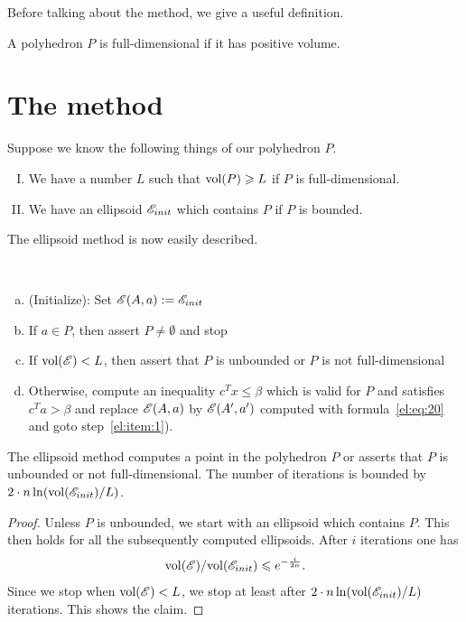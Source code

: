 Before talking about the method, we give a useful definition.

\begin{definition}
   A polyhedron $P$ is full-dimensional if it has positive volume.
\end{definition}

\section{The method}
\label{el:sec:method}



Suppose  we know the following things of our polyhedron $P$. 
\begin{enumerate}[I)]
\item We have a number $L$ such that $\mathrm{vol}(P)\geqslant L$ if $P$ is
  full-dimensional.
\item We have an ellipsoid $\mathscr{E}_{init}$ which contains $P$ if $P$ is
  bounded.
\end{enumerate}
The ellipsoid method is now easily described.


\begin{algorithm}
\label{el:alg:3}
~

\begin{enumerate}[a)]
\item (Initialize): Set $\mathscr{E}(A,a) := \mathscr{E}_{init}$ \label{el:item:2}
\item If $a \in P$, then assert $P \neq \emptyset$ and stop  \label{el:item:1} 
\item If $\mathrm{vol}(\mathscr{E})<L$, then assert that $P$ is unbounded or $P$ is
  not full-dimensional \label{el:item:3}
\item Otherwise, compute an inequality $c^Tx\leq\beta$ which is valid for
  $P$ and satisfies $c^Ta>\beta$ and replace $\mathscr{E}(A,a)$ by $\mathscr{E}(A',a')$
  computed with formula~\eqref{el:eq:20} and goto
  step~\ref{el:item:1}).\label{el:item:4}  
\end{enumerate}
\end{algorithm}
%
\begin{theorem}
  \label{el:thr:21}
  The ellipsoid method computes a point in the polyhedron $P$ or
  asserts that $P$ is unbounded or not full-dimensional. The number of
  iterations is bounded by  $2\cdot n \ln (\mathrm{vol}(\mathscr{E}_{init}) / L)$.
\end{theorem}


\begin{proof}
  Unless $P$ is unbounded, we start with an ellipsoid which contains
  $P$. This then holds for all the subsequently computed
  ellipsoids. After $i$ iterations one has
  \begin{equation}
    \label{el:eq:23}
    \mathrm{vol}(\mathscr{E})/ \mathrm{vol}(\mathscr{E}_{init}) \leqslant e^{-\frac{i}{2n}}.
  \end{equation}
 Since we stop when $\mathrm{vol}(\mathscr{E})<L$, we stop at least after $2\cdot n
 \ln(\mathrm{vol}(\mathscr{E}_{init})/ L)$ iterations. This shows the claim.   
\end{proof}



